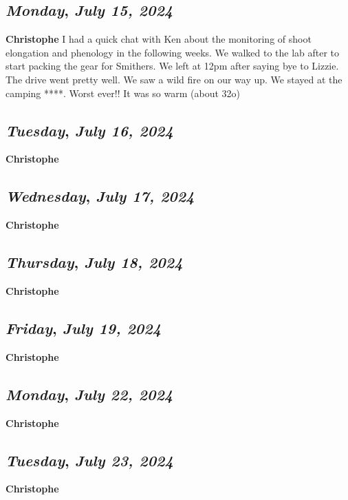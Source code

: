 \def\day{\textit{July 15, 2024}}
\def\weekday{\textit{Monday}}
\subsection*{\weekday, \day}
\textbf {Christophe}
I had a quick chat with Ken about the monitoring of shoot elongation and phenology in the following weeks. We walked to the lab after to start packing the gear for Smithers. We left at 12pm after saying bye to Lizzie.\\
The drive went pretty well. We saw a wild fire on our way up. We stayed at the camping ****. Worst ever!! It was so warm (about 32o)

\def\day{\textit{July 16, 2024}}
\def\weekday{\textit{Tuesday}}
\subsection*{\weekday, \day}
\textbf {Christophe}

\def\day{\textit{July 17, 2024}}
\def\weekday{\textit{Wednesday}}
\subsection*{\weekday, \day}
\textbf {Christophe}

\def\day{\textit{July 18, 2024}}
\def\weekday{\textit{Thursday}}
\subsection*{\weekday, \day}
\textbf {Christophe}

\def\day{\textit{July 19, 2024}}
\def\weekday{\textit{Friday}}
\subsection*{\weekday, \day}
\textbf {Christophe}


\def\day{\textit{July 22, 2024}}
\def\weekday{\textit{Monday}}
\subsection*{\weekday, \day}
\textbf {Christophe}

\def\day{\textit{July 23, 2024}}
\def\weekday{\textit{Tuesday}}
\subsection*{\weekday, \day}
\textbf {Christophe}

\def\day{\textit{July 24, 2024}}
\def\weekday{\textit{Wednesday}}
